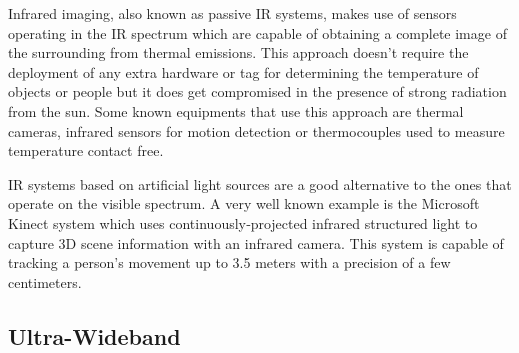 Infrared imaging, also known as passive \ac{IR} systems, makes use of sensors operating in the \ac{IR} spectrum which are capable of obtaining a complete image of the surrounding from thermal emissions. This approach doesn’t require the deployment of any extra hardware or tag for determining the temperature of objects or people but it does get compromised in the presence of strong radiation from the sun. Some known equipments that use this approach are thermal cameras, infrared sensors for motion detection or thermocouples used to measure temperature contact free.   
  
\ac{IR} systems based on artificial light sources are a good alternative to the ones that operate on the visible spectrum. A very well known example is the Microsoft Kinect system which uses continuously‐projected infrared structured light to capture 3D scene information with an infrared camera. This system is capable of tracking a person's movement up to 3.5 meters with a precision of a few centimeters.   
  
\subsection{Ultra-Wideband}  
\label{subsec:uwb}  
  

